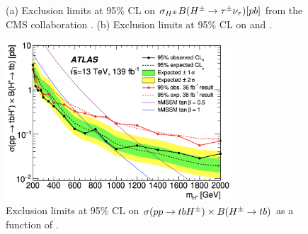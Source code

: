 		\begin{figure}[!ht]
			\centering
			\caption{\label{fig:hpm-taunu-cms-limits} (a) Exclusion limits at 95\% CL on $\sigma_{H^{\pm}} B(H^{\pm} \to \tau^\pm \nu_{\tau}) [pb]$ from the CMS collaboration \cite{CMS-taunu}. (b) Exclusion limits at 95\% CL on \tanb and \mHpm \cite{CMS-taunu}. }
		\end{figure}

		\begin{figure}[!ht]
			\centering
			\includegraphics[width=0.75\textwidth]{chapters/chapter2_theory/images/HPlus_to_tb_Limits.png}
			\caption{\label{fig:hpm-tb-limits} Exclusion limits at 95\% CL on $\sigma (pp \to tbH^{\pm}) \times B(H^{\pm} \to tb)$ as a function of \mHpm \cite{Hpm-to-tb}. }
		\end{figure}

